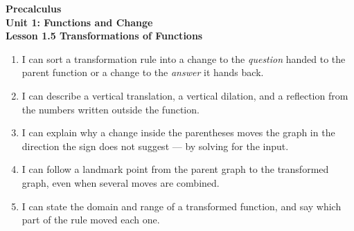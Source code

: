 \documentclass[10pt]{article}
\begin{document}
\vspace{-0.8in}

\begin{center}
  {\color{white}\textbf{\LARGE Precalculus}}\\[4pt]
  {\color{lilacmid}\large\textbf{Unit 1: Functions and Change}}\\[6pt]
  {\color{white}\textbf{\large Lesson 1.5 \quad Transformations of Functions}}
\end{center}

\vspace{0.22in}
\namedateperiod
\vspace{0.18in}

\begin{learningtargetbox}
\small
\begin{enumerate}[leftmargin=1.5em, itemsep=5pt]
  \item I can sort a transformation rule into a change to the \textit{question}
        handed to the parent function or a change to the \textit{answer} it
        hands back.
  \item I can describe a vertical translation, a vertical dilation, and a
        reflection from the numbers written outside the function.
  \item I can explain why a change inside the parentheses moves the graph in
        the direction the sign does not suggest --- by solving for the input.
  \item I can follow a landmark point from the parent graph to the transformed
        graph, even when several moves are combined.
  \item I can state the domain and range of a transformed function, and say
        which part of the rule moved each one.
\end{enumerate}
\end{learningtargetbox}

\vspace{0.14in}
\end{document}
